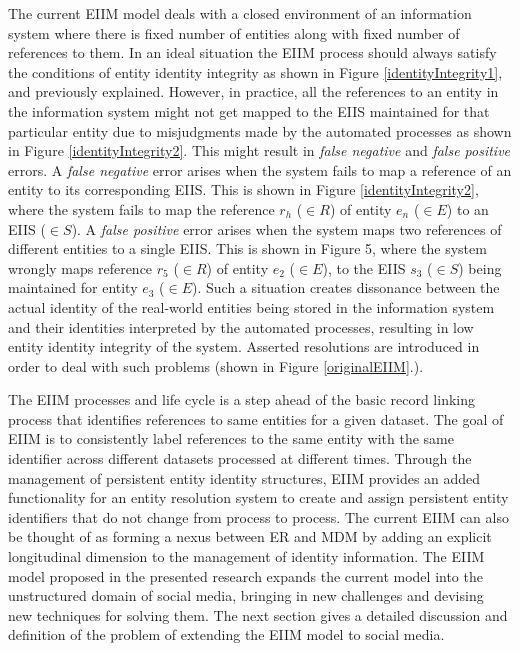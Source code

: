 The current EIIM model deals with a closed environment of an information system where there is fixed number of entities along with fixed number of references to them. In an ideal situation the EIIM process should always satisfy the conditions of entity identity integrity as shown in Figure \ref{identityIntegrity1}, and previously explained. However, in practice, all the references to an entity in the information system might not get mapped to the EIIS maintained for that particular entity due to misjudgments made by the automated processes as shown in Figure \ref{identityIntegrity2}. This might result in \textit{false negative} and \textit{false positive} errors. A \textit{false negative} error arises when the system fails to map a reference of an entity to its corresponding EIIS. This is shown in Figure \ref{identityIntegrity2}, where the system fails to map the reference $r_{h}$ ($\in R$) of entity $e_{n}$ ($\in E$) to an EIIS ($\in S$). A \textit{false positive} error arises when the system maps two references of different entities to a single EIIS. This is shown in Figure 5, where the system wrongly maps reference $r_{5}$ ($\in R$) of entity $e_{2}$ ($\in E$), to the EIIS $s_{3}$ ($\in S$) being maintained for entity $e_{3}$ ($\in E$). Such a situation creates dissonance between the actual identity of the real-world entities being stored in the information system and their identities interpreted by the automated processes, resulting in low entity identity integrity of the system. Asserted resolutions are introduced in order to deal with such problems (shown in Figure \ref{originalEIIM}.).

The EIIM processes and life cycle is a step ahead of the basic record linking process that identifies references to same entities for a given dataset. The goal of EIIM is to consistently label references to the same entity with the same identifier across different datasets processed at different times. Through the management of persistent entity identity structures, EIIM provides an added functionality for an entity resolution system to create and assign persistent entity identifiers that do not change from process to process. The current EIIM can also be thought of as forming a nexus between ER and MDM by adding an explicit longitudinal dimension to the management of identity information. The EIIM model proposed in the presented research expands the current model into the unstructured domain of social media, bringing in new challenges and devising new techniques for solving them. The next section gives a detailed discussion and definition of the problem of extending the EIIM model to social media.

